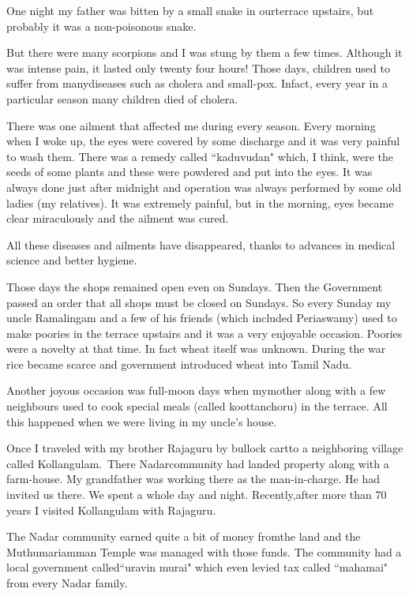 One night my father was bitten by a small snake in our\break terrace upstairs, 
but probably it was a non-poisonous snake.

But there were many scorpions and I was stung by them a few times. 
Although it was intense pain, it lasted only twenty four hours! Those 
days, children used to suffer from many\break diseases such as cholera and 
small-pox. Infact, every year in a particular season many children died 
of cholera.


There was one ailment that affected me during every season. 
Every morning when I woke up, the eyes were covered by some discharge 
and it was very painful to wash them. There was a remedy called 
``kaduvudan" which, I think, were the seeds of some plants and these were 
powdered and put into the eyes. It was always done just after midnight 
and operation was always performed by some old ladies (my relatives). It 
was extremely painful, but in the morning, eyes became clear 
miraculously and the ailment was cured.


All these diseases and ailments have disappeared, thanks to advances in 
medical science and better hygiene.
 
Those days the shops remained open even on Sundays. Then the Government 
passed an order that all shops must be closed on Sundays. So every 
Sunday my uncle Ramalingam and a few of his friends (which included 
Periaswamy) used to make poories in the terrace upstairs and it was a 
very enjoyable occasion. Poories were a novelty at that time. In fact 
wheat itself was unknown. During the war rice became scarce and 
government introduced wheat into Tamil Nadu.


Another joyous occasion was full-moon days when my\break mother along with a 
few neighbours used to cook special meals (called koottanchoru) in the 
terrace. All this happened when we were living in my uncle's house.
 
Once I traveled with my brother Rajaguru by bullock cart\break to a 
neighboring village called Kollangulam.\ There Nadar\break community had landed 
property along with a farm-house. My grandfather was working there as 
the man-in-charge. He had invited us there. We spent a whole day and 
night. Recently,\break after more than 70 years I visited Kollangulam with 
Rajaguru.

The Nadar community earned quite a bit of money from\break the land and the 
Muthumariamman Temple was managed with those funds. The community had a 
local government called\break ``uravin murai" which even levied tax called 
``mahamai" from every Nadar family.

